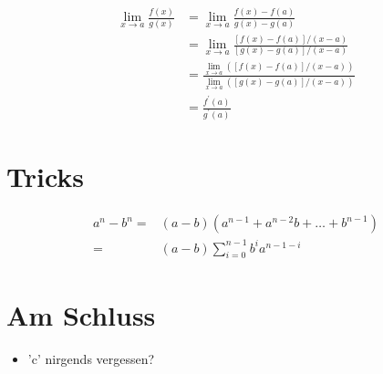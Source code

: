\Beweis[Hôpital]
\begin{align*}
\lim _{x \rightarrow a} \frac{f(x)}{g(x)} &=\lim _{x \rightarrow a} \frac{f(x)-f(a)}{g(x)-g(a)} \\
&=\lim _{x \rightarrow a} \frac{[f(x)-f(a)] /(x-a)}{[g(x)-g(a)] /(x-a)} \\
&=\frac{\lim _{x \rightarrow a}([f(x)-f(a)] /(x-a))}{\lim _{x \rightarrow a}([g(x)-g(a)] /(x-a))} \\
&=\frac{f^{\prime}(a)}{g^{\prime}(a)}
\end{align*}

\section{Tricks}
\Trick
\begin{align*}
a^n-b^n =& (a-b)(a^{n-1} + a^{n-2} b +\dots+b^{n-1}) \\
		=& (a-b)\sum_{i=0}^{n-1} b^{i}a^{n-1-i} 
\end{align*}

\section{Am Schluss}
\begin{itemize}
	\item 'c' nirgends vergessen?
\end{itemize}